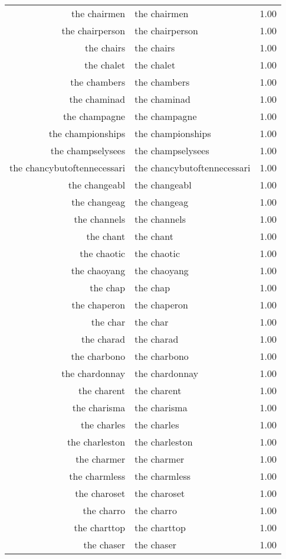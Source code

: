 \begin{table}[ht]
\begin{tabular}{rlr}
  the chairmen & the chairmen & 1.00 \\ 
  the chairperson & the chairperson & 1.00 \\ 
  the chairs & the chairs & 1.00 \\ 
  the chalet & the chalet & 1.00 \\ 
  the chambers & the chambers & 1.00 \\ 
  the chaminad & the chaminad & 1.00 \\ 
  the champagne & the champagne & 1.00 \\ 
  the championships & the championships & 1.00 \\ 
  the champselysees & the champselysees & 1.00 \\ 
  the chancybutoftennecessari & the chancybutoftennecessari & 1.00 \\ 
  the changeabl & the changeabl & 1.00 \\ 
  the changeag & the changeag & 1.00 \\ 
  the channels & the channels & 1.00 \\ 
  the chant & the chant & 1.00 \\ 
  the chaotic & the chaotic & 1.00 \\ 
  the chaoyang & the chaoyang & 1.00 \\ 
  the chap & the chap & 1.00 \\ 
  the chaperon & the chaperon & 1.00 \\ 
  the char & the char & 1.00 \\ 
  the charad & the charad & 1.00 \\ 
  the charbono & the charbono & 1.00 \\ 
  the chardonnay & the chardonnay & 1.00 \\ 
  the charent & the charent & 1.00 \\ 
  the charisma & the charisma & 1.00 \\ 
  the charles & the charles & 1.00 \\ 
  the charleston & the charleston & 1.00 \\ 
  the charmer & the charmer & 1.00 \\ 
  the charmless & the charmless & 1.00 \\ 
  the charoset & the charoset & 1.00 \\ 
  the charro & the charro & 1.00 \\ 
  the charttop & the charttop & 1.00 \\ 
  the chaser & the chaser & 1.00 \\ 

\end{tabular}
\end{table}
